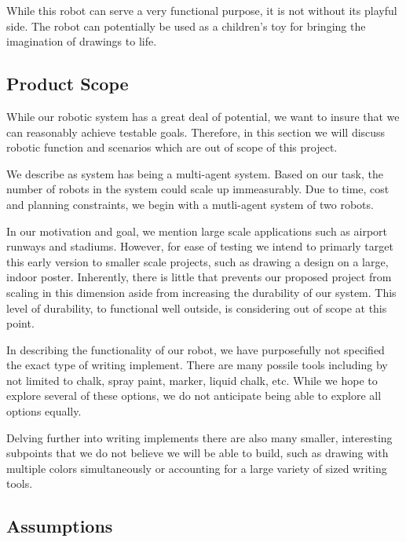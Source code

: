 While this robot can serve a very functional purpose, it is not without its playful side. The robot can potentially be used as a children's toy for bringing the imagination of drawings to life. 

\subsection{Product Scope}
\label{sec:project_scope}
While our robotic system has a great deal of potential, we want to insure that we can reasonably achieve testable goals. Therefore, in this section we will discuss robotic function and scenarios which are out of scope of this project. 

We describe as system has being a multi-agent system. Based on our task, the number of robots in the system could scale up immeasurably. Due to time, cost and planning constraints, we begin with a mutli-agent system of two robots. 

In our motivation and goal, we mention large scale applications such as airport runways and stadiums. However, for ease of testing we intend to primarly target this early version to smaller scale projects, such as drawing a design on a large, indoor poster. Inherently, there is little that prevents our proposed project from scaling in this dimension aside from increasing the durability of our system. This level of durability, to functional well outside, is considering out of scope at this point. 

In describing the functionality of our robot, we have purposefully not specified the exact type of writing implement. There are many possile tools including by not limited to chalk, spray paint, marker, liquid chalk, etc. While we hope to explore several of these options, we do not anticipate being able to explore all options equally. 

Delving further into writing implements there are also many smaller, interesting subpoints that we do not believe we will be able to build, such as drawing with multiple colors simultaneously or accounting for a large variety of sized writing tools. 

\subsection{Assumptions}
\label{sec:assumptions}

